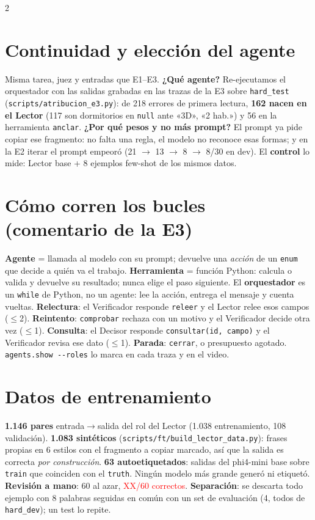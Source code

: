 \documentclass[9pt,a4paper]{extarticle}
\newcommand{\pend}[1]{\textcolor{red}{#1}}
\newcommand{\cod}[1]{\texttt{#1}}
\begin{document}
\begin{multicols}{2}
\section{Continuidad y elección del agente}
Misma tarea, juez y entradas que E1--E3. \textbf{¿Qué agente?} Re-ejecutamos el orquestador con las salidas grabadas en las trazas de la E3 sobre \cod{hard\_test} (\cod{scripts/atribucion\_e3.py}): de 218 errores de primera lectura, \textbf{162 nacen en el Lector} (117 son dormitorios en \cod{null} ante «3D», «2 hab.») y 56 en la herramienta \cod{anclar}. \textbf{¿Por qué pesos y no más prompt?} El prompt ya pide copiar ese fragmento: no falta una regla, el modelo no reconoce esas formas; y en la E2 iterar el prompt empeoró (21 $\to$ 13 $\to$ 8 $\to$ 8/30 en dev). El \textbf{control} lo mide: Lector base + 8 ejemplos few-shot de los mismos datos.

\section{Cómo corren los bucles (comentario de la E3)}
\textbf{Agente} = llamada al modelo con su prompt; devuelve una \emph{acción} de un \cod{enum} que decide a quién va el trabajo. \textbf{Herramienta} = función Python: calcula o valida y devuelve su resultado; nunca elige el paso siguiente. El \textbf{orquestador} es un \cod{while} de Python, no un agente: lee la acción, entrega el mensaje y cuenta vueltas. \textbf{Relectura}: el Verificador responde \cod{releer} y el Lector relee esos campos ($\le$2). \textbf{Reintento}: \cod{comprobar} rechaza con un motivo y el Verificador decide otra vez ($\le$1). \textbf{Consulta}: el Decisor responde \cod{consultar(id, campo)} y el Verificador revisa ese dato ($\le$1). \textbf{Parada}: \cod{cerrar}, o presupuesto agotado. \cod{agents.show -{}-roles} lo marca en cada traza y en el video.

\section{Datos de entrenamiento}
\textbf{1.146 pares} entrada$\to$salida del rol del Lector (1.038 entrenamiento, 108 validación). \textbf{1.083 sintéticos} (\cod{scripts/ft/build\_lector\_data.py}): frases propias en 6 estilos con el fragmento a copiar marcado, así que la salida es correcta \emph{por construcción}. \textbf{63 autoetiquetados}: salidas del phi4-mini base sobre \cod{train} que coinciden con el \cod{truth}. Ningún modelo más grande generó ni etiquetó. \textbf{Revisión a mano}: 60 al azar, \pend{XX/60 correctos}. \textbf{Separación}: se descarta todo ejemplo con 8 palabras seguidas en común con un set de evaluación (4, todos de \cod{hard\_dev}); un test lo repite.


\end{multicols}
\end{document}
